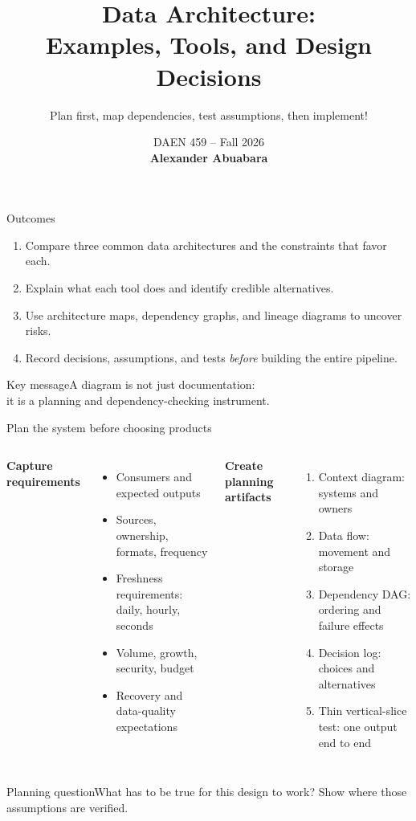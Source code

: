 \documentclass[aspectratio=43,10pt]{beamer}
\title{Data Architecture:\\Examples, Tools, and Design Decisions}
\subtitle{Plan first, map dependencies, test assumptions, then implement!}
\author{}
\date{\textcolor{aggiemaroon}{DAEN 459 -- Fall 2026\\
      \textbf{Alexander Abuabara}}}
\begin{document}
\begin{frame}\titlepage\end{frame}

\begin{frame}{Outcomes}
\begin{enumerate}
\item Compare three common data architectures and the constraints that favor each.
\item Explain what each tool does and identify credible alternatives.
\item Use architecture maps, dependency graphs, and lineage diagrams to uncover risks.
\item Record decisions, assumptions, and tests \emph{before} building the entire pipeline.
\end{enumerate}
\begin{block}{Key message}A diagram is not just documentation:\\it is a planning and dependency-checking instrument.\end{block}
\end{frame}

\begin{frame}{Plan the system before choosing products}
\begin{columns}[T]
\textbf{Capture requirements}
\begin{itemize}
\item Consumers and expected outputs
\item Sources, ownership, formats, frequency
\item Freshness requirements: daily, hourly, seconds
\item Volume, growth, security, budget
\item Recovery and data-quality expectations
\end{itemize}
\textbf{Create planning artifacts}
\begin{enumerate}
\item Context diagram: systems and owners
\item Data flow: movement and storage
\item Dependency DAG: ordering and failure effects
\item Decision log: choices and alternatives
\item Thin vertical-slice test: one output end to end
\end{enumerate}
\end{columns}
\begin{block}{Planning question}What has to be true for this design to work? Show where those assumptions are verified.\end{block}
\end{frame}
\end{document}
